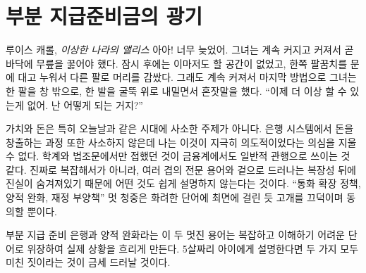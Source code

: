 \chapter{부분 지급준비금의 광기}
\label{les:13}

\begin{chapquote}{루이스 캐롤, \textit{이상한 나라의 앨리스}}
	아아! 너무 늦었어. 그녀는 계속 커지고 커져서 곧 바닥에 무릎을 꿇어야 했다.
	잠시 후에는 이마저도 할 공간이 없었고, 한쪽 팔꿈치를 문에 대고 누워서 다른 팔로 머리를 감쌌다.
	그래도 계속 커져서 마지막 방법으로 그녀는 한 팔을 창 밖으로, 한 발을 굴뚝 위로 내밀면서
	혼잣말을 했다. \enquote{이제 더 이상 할 수 있는게 없어. 난 어떻게 되는 거지?}
\end{chapquote}

\begin{comment}
	Value and money aren't trivial topics, especially in today's times. The
	process of money creation in our banking system is equally non-trivial,
	and I can't shake the feeling that this is deliberately so. What I have
	previously only encountered in academia and legal texts seems to be
	common practice in the financial world as well: nothing is explained in
	simple terms, not because it is truly complex, but because the truth is
	hidden behind layers and layers of jargon and \textit{apparent} complexity.
	\enquote{Expansionary monetary policy, quantitative easing, fiscal stimulus to
		the economy.} The audience nods along in agreement, hypnotized by the
	fancy words.
\end{comment}
가치와 돈은 특히 오늘날과 같은 시대에 사소한 주제가 아니다. 
은행 시스템에서 돈을 창출하는 과정 또한 사소하지 않은데 나는 이것이 지극히 의도적이었다는 의심을 지울 수 없다. 
학계와 법조문에서만 접했던 것이 금융계에서도 일반적 관행으로 쓰이는 것 같다.
진짜로 복잡해서가 아니라, 여러 겹의 전문 용어와 겉으로 드러나는 복장성 뒤에 진실이 숨겨져있기 때문에 어떤 것도 쉽게 설명하지 않는다는 것이다.
\enquote{통화 확장 정책, 양적 완화, 재정 부양책} 멋
청중은 화려한 단어에 최면에 걸린 듯 고개를 끄덕이며 동의할 뿐이다.

\begin{comment}
	Fractional reserve banking and quantitative easing are two of those
	fancy words, obfuscating what is really happening by masking it as
	complex and difficult to understand. If you would explain them to a
	five-year-old, the insanity of both will become apparent quickly.
\end{comment}
부분 지급 준비 은행과 양적 완화라는 이 두 멋진 용어는 
복잡하고 이해하기 어려운 단어로 위장하여 실제 상황을 흐리게 만든다. 
5살짜리 아이에게 설명한다면 두 가지 모두 미친 짓이라는 것이 금세 드러날 것이다.

